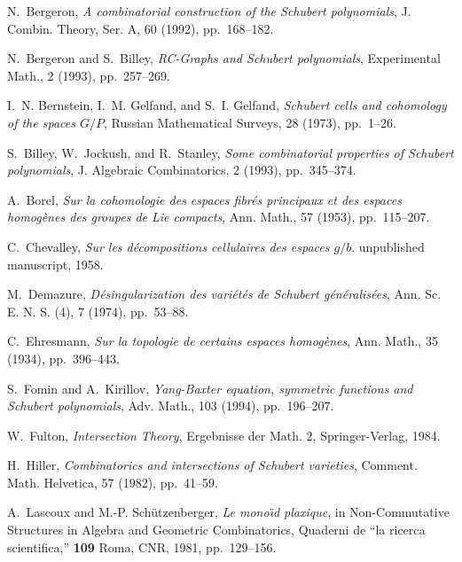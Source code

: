 \begin{thebibliography}{10}

{\sc N.~Bergeron}, {\em A combinatorial construction of the {S}chubert
  polynomials}, J. Combin. Theory, Ser. A, 60 (1992), pp.~168--182.

{\sc N.~Bergeron and S.~Billey}, {\em {R}{C}-{G}raphs and {S}chubert
  polynomials}, Experimental Math., 2 (1993), pp.~257--269.

{\sc I.~N. Bernstein, I.~M. Gelfand, and S.~I. Gelfand}, {\em Schubert cells
  and cohomology of the spaces {$G/P$}}, Russian Mathematical Surveys, 28
  (1973), pp.~1--26.

{\sc S.~Billey, W.~Jockush, and R.~Stanley}, {\em Some combinatorial properties
  of {S}chubert polynomials}, J. Algebraic Combinatorics, 2 (1993),
  pp.~345--374.

{\sc A.~Borel}, {\em Sur la cohomologie des espaces fibr\'es principaux et des
  espaces homog\`enes des groupes de {L}ie compacts}, Ann. Math., 57 (1953),
  pp.~115--207.

{\sc C.~Chevalley}, {\em Sur les d\'ecompositions cellulaires des espaces
  $g/b$}.
\newblock unpublished manuscript, 1958.

{\sc M.~Demazure}, {\em D\'esingularization des vari\'et\'es de {S}chubert
  g\'en\'eralis\'ees}, Ann. Sc. E. N. S. (4), 7 (1974), pp.~53--88.

{\sc C.~Ehresmann}, {\em Sur la topologie de certains espaces homog\`enes},
  Ann. Math., 35 (1934), pp.~396--443.

{\sc S.~Fomin and A.~Kirillov}, {\em {Y}ang-{B}axter equation, symmetric
  functions and {S}chubert polynomials}, Adv. Math., 103 (1994), pp.~196--207.

{\sc W.~Fulton}, {\em Intersection Theory}, Ergebnisse der Math. 2,
  Springer-Verlag, 1984.

{\sc H.~Hiller}, {\em Combinatorics and intersections of {S}chubert varieties},
  Comment. Math. Helvetica, 57 (1982), pp.~41--59.

{\sc A.~Lascoux and M.-P. Sch{\"u}tzenberger}, {\em Le m{ono\"{\i}d} plaxique},
  in Non-Commutative Structures in Algebra and Geometric Combinatorics,
  Quaderni de {``la ricerca scientifica,''} {\bf 109} Roma, CNR, 1981,
  pp.~129--156.


\end{thebibliography}
